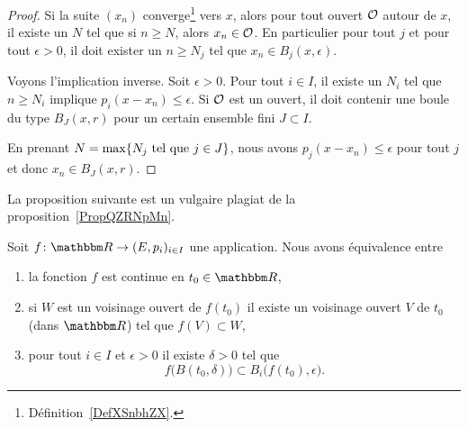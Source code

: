 \begin{proof}
    Si la suite \( (x_n)\) converge\footnote{Définition~\ref{DefXSnbhZX}.} vers \( x\), alors pour tout ouvert \( \mathcal{O}\) autour de \( x\), il existe un \( N\) tel que si \( n\geq N\), alors \( x_n\in\mathcal{O}\). En particulier pour tout \( j\) et pour tout \( \epsilon>0\), il doit exister un \( n\geq N_j\) tel que \( x_n\in B_j(x,\epsilon)\).

    Voyons l'implication inverse. Soit \( \epsilon>0\). Pour tout \( i\in I\), il existe un \( N_i\) tel que \( n\geq N_i\) implique \( p_i(x-x_n)\leq \epsilon\). Si \( \mathcal{O}\) est un ouvert, il doit contenir une boule du type \( B_J(x,r)\) pour un certain ensemble fini \( J\subset I\).

    En prenant \( N=\max\{ N_j\text{ tel que } j\in J \}\), nous avons \( p_j(x-x_n)\leq \epsilon\) pour tout \( j\) et donc \( x_n\in B_J(x,r)\).
\end{proof}

La proposition suivante est un vulgaire plagiat de la proposition~\ref{PropQZRNpMn}.
\begin{proposition} \label{PropNGjQnqF}
    Soit \( f\colon \eR\to (E,p_i)_{i\in I}\) une application. Nous avons équivalence entre
    \begin{enumerate}
        \item   \label{ItemHNxGMpCi}
            la fonction \( f\) est continue en \( t_0\in \eR\),
        \item\label{ItemHNxGMpCii}
            si \( W\) est un voisinage ouvert de \( f(t_0)\) il existe un voisinage ouvert \( V\) de \( t_0\) (dans \( \eR\)) tel que \( f(V)\subset W\),
        \item\label{ItemHNxGMpCiii}
            pour tout \( i\in I\) et \( \epsilon>0\) il existe \( \delta>0\) tel que
            \begin{equation}
                f\big( B(t_0,\delta) \big)\subset B_i\big( f(t_0),\epsilon \big).
            \end{equation}
    \end{enumerate}
\end{proposition}

